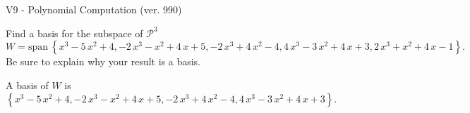 \begin{exercise}
  \begin{exerciseTitle}V9 - Polynomial Computation (ver. 990)\end{exerciseTitle}
  \begin{exerciseStatement}
    Find a basis for the subspace of \(\mathcal{P}^3\) 
\[W=\mathrm{span}\ \left\{x^{3} - 5 \, x^{2} + 4 , -2 \, x^{3} - x^{2} + 4 \, x + 5 , -2 \, x^{3} + 4 \, x^{2} - 4 , 4 \, x^{3} - 3 \, x^{2} + 4 \, x + 3 , 2 \, x^{3} + x^{2} + 4 \, x - 1\right\}.\]
 Be sure to explain why your result is a basis.


  \end{exerciseStatement}
  \begin{exerciseAnswer}
   A basis of \(W\) is  \(\left\{x^{3} - 5 \, x^{2} + 4 , -2 \, x^{3} - x^{2} + 4 \, x + 5 , -2 \, x^{3} + 4 \, x^{2} - 4 , 4 \, x^{3} - 3 \, x^{2} + 4 \, x + 3\right\}\).
  


  \end{exerciseAnswer}
\end{exercise}
